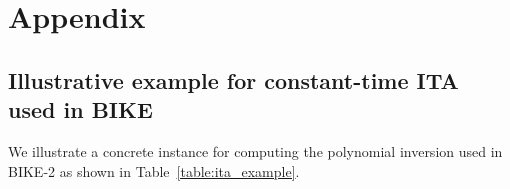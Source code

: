 \documentclass[runningheads]{llncs}
\begin{document}

%
%
%
% 
% 
%



\newpage

\section*{Appendix}
%

\subsection{Illustrative example for constant-time ITA used in BIKE}
We illustrate a concrete instance for computing the polynomial inversion used in BIKE-2 as shown in Table~\ref{table:ita_example}. 
\end{document}
